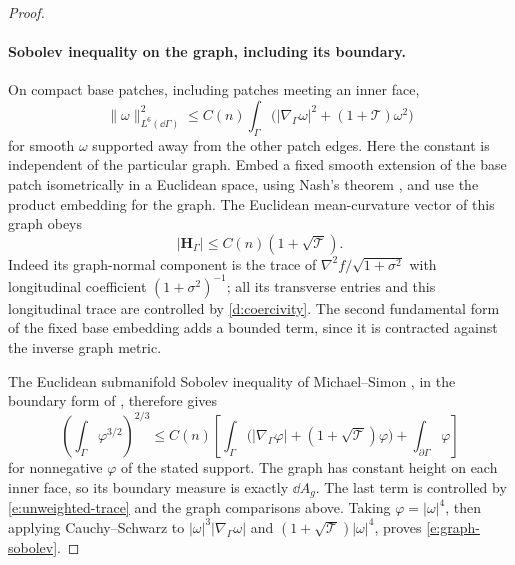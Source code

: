 \begin{proof}
\paragraph{Sobolev inequality on the graph, including its boundary.}
On compact base patches, including patches meeting an inner face,
\begin{equation}\label{e:graph-sobolev}
 \|\omega\|_{L^6(\dd\Gamma)}^2
 \le C(n)\int_\Gamma
       \bigl(|\nabla_\Gamma\omega|^2+
                         (1+\mathcal T)\omega^2\bigr)
\end{equation}
for smooth $\omega$ supported away from the other patch edges.
Here the constant is independent of the particular graph.
Embed a fixed smooth extension of the base patch isometrically in a
Euclidean space, using Nash's theorem \cite{Nash1956}, and use the
product embedding for the graph.  The Euclidean mean-curvature vector
of this graph obeys
\[
 |\mathbf H_\Gamma|\le C(n)(1+\sqrt{\mathcal T}).
\]
Indeed its graph-normal component is the trace of
$\nabla^2f/\sqrt{1+\sigma^2}$ with longitudinal coefficient
$(1+\sigma^2)^{-1}$; all its transverse entries and this longitudinal
trace are controlled by \eqref{d:coercivity}.  The second fundamental
form of the fixed base embedding adds a bounded term, since it is
contracted against the inverse graph metric.

The Euclidean submanifold Sobolev inequality of Michael--Simon
\cite{MichaelSimon1973}, in the boundary form of
\cite[Theorem~1]{Brendle2021}, therefore gives
\[
 \left(\int_\Gamma\varphi^{3/2}\right)^{2/3}
 \le C(n)\left[
 \int_\Gamma\bigl(|\nabla_\Gamma\varphi|+
                   (1+\sqrt{\mathcal T})\varphi\bigr)
                  +\int_{\partial\Gamma}\varphi\right]
\]
for nonnegative $\varphi$ of the stated support.  The graph has
constant height on each inner face, so its boundary measure is exactly
$\dd A_g$.  The last term is controlled by
\eqref{e:unweighted-trace} and the graph comparisons above.  Taking
$\varphi=|\omega|^4$, then applying Cauchy--Schwarz to
$|\omega|^3|\nabla_\Gamma\omega|$ and
$(1+\sqrt{\mathcal T})|\omega|^4$, proves
\eqref{e:graph-sobolev}.


\end{proof}
